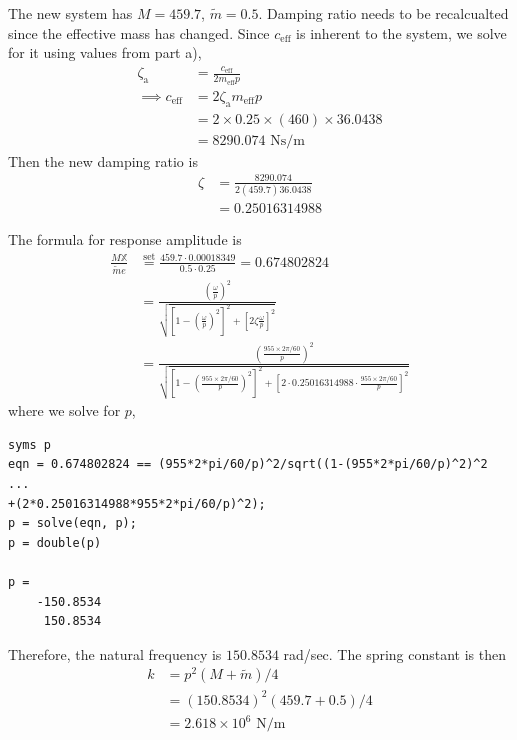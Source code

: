 \subsubsection{}
The new system has $M = 459.7$, $\tilde{m} = 0.5$. Damping ratio needs to be recalcualted since the effective mass has changed. Since $c_{\text{eff}}$ is inherent to the system, we solve for it using values from part a),
\begin{align*}
    \zeta_{\text{a}} &= \frac{c_{\text{eff}}}{2 m_{\text{eff}} p} \\
    \implies c_{\text{eff}} &= 2 \zeta_{\text{a}} m_{\text{eff}} p \\
    &= 2 \times 0.25 \times (460) \times 36.0438 \\
    &= 8290.074 \text{ Ns/m}
\end{align*}
Then the new damping ratio is
\begin{align*}
    \zeta &= \frac{8290.074}{2(459.7)36.0438} \\
    &= 0.25016314988
\end{align*}

The formula for response amplitude is 
\begin{align*}
    \frac{M \mathbb{X}}{\tilde{m} e} &\overset{\text{set}}{=} \frac{459.7 \cdot 0.00018349}{0.5 \cdot 0.25} = 0.674802824 \\
    &= \frac{\left(\frac{\omega}{p}\right)^2}{\sqrt{\left[1 - \left(\frac{\omega}{p}\right)^2\right]^2 + \left[2 \zeta \frac{\omega}{p}\right]^2}} \\
    &= \frac{\left(\frac{955 \times 2\pi/60}{p}\right)^2}{\sqrt{\left[1 - \left(\frac{955 \times 2\pi/60}{p}\right)^2\right]^2 + \left[2 \cdot 0.25016314988 \cdot \frac{955 \times 2\pi/60}{p}\right]^2}}
\end{align*}
where we solve for $p$,
\begin{verbatim}
syms p
eqn = 0.674802824 == (955*2*pi/60/p)^2/sqrt((1-(955*2*pi/60/p)^2)^2 ...
+(2*0.25016314988*955*2*pi/60/p)^2);
p = solve(eqn, p);
p = double(p)

p =
    -150.8534
     150.8534 
\end{verbatim}
Therefore, the natural frequency is $150.8534$ rad/sec. The spring constant is then
\begin{align*}
    k &= p^2(M+ \tilde{m})/4 \\
    &= (150.8534)^2(459.7 + 0.5)/4 \\
    &= \boxed{2.618 \times 10^6 \text{ N/m}}
\end{align*}